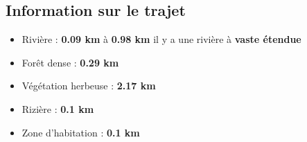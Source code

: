 \documentclass[]{article}
\begin{document}
\hypertarget{information-sur-le-trajet}{%
\subsection{Information sur le trajet}\label{information-sur-le-trajet}}

\begin{itemize}
\item
  Rivière : \textbf{0.09 km} \textbar{} à \textbf{0.98 km} il y a une
  rivière à \textbf{vaste étendue}
\item
  Forêt dense : \textbf{0.29 km}
\item
  Végétation herbeuse : \textbf{2.17 km}
\item
  Rizière : \textbf{0.1 km}
\item
  Zone d'habitation : \textbf{0.1 km}
\end{itemize}
\end{document}
